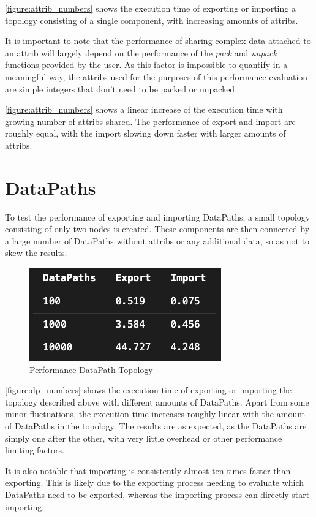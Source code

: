 \autoref{figure:attrib_numbers} shows the execution time of exporting or importing a topology consisting of a single component, with increasing amounts of attribs.

It is important to note that the performance of sharing complex data attached to an attrib will largely depend on the performance of the \emph{pack} and \emph{unpack} functions provided by the user.
As this factor is impossible to quantify in a meaningful way, the attribs used for the purposes of this performance evaluation are simple integers that don't need to be packed or unpacked.

\autoref{figure:attrib_numbers} shows a linear increase of the execution time with growing number of attribs shared. The performance of export and import are roughly equal, with the import slowing down faster with larger amounts of attribs.

\section{DataPaths}
To test the performance of exporting and importing DataPaths, a small topology consisting of only two nodes is created.
These components are then connected by a large number of DataPaths without attribs or any additional data, so as not to skew the results.

\begin{figure}[ht]
    \includegraphics[scale=0.75]{images/dp_numbers.png} %
    \centering
    \caption{Performance DataPath Topology}
    \label{figure:dp_numbers}
\end{figure}

\autoref{figure:dp_numbers} shows the execution time of exporting or importing the topology described above with different amounts of DataPaths.
Apart from some minor fluctuations, the execution time increases roughly linear with the amount of DataPaths in the topology.
The results are as expected, as the DataPaths are simply one after the other, with very little overhead or other performance limiting factors.

It is also notable that importing is consistently almost ten times faster than exporting.
This is likely due to the exporting process needing to evaluate which DataPaths need to be exported, whereas the importing process can directly start importing.